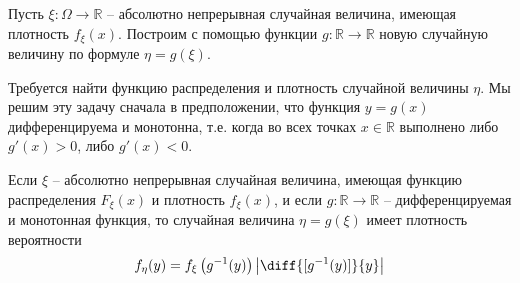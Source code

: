 \begin{zam}
\label{zam:14.1}
Пусть $\xi : \Omega \to \mathbb{R}$ -- абсолютно непрерывная случайная величина, имеющая плотность $f_\xi (x)$. Построим с помощью функции $g : \mathbb{R} \to \mathbb{R}$ новую случайную величину по формуле $\eta = g(\xi)$. 

Требуется найти функцию распределения и плотность случайной величины $\eta$. Мы решим эту задачу сначала в предположении, что функция $y = g(x)$ дифференцируема и монотонна, т.е. когда во всех точках $x \in \mathbb{R}$ выполнено либо $g′(x) > 0$, либо $g′(x) < 0$.	
\end{zam}
\begin{theorem}
	\label{th:14.2}
Если $\xi$ -- абсолютно непрерывная случайная величина, имеющая функцию распределения $F_\xi (x)$ и плотность $f_\xi (x)$, и если $g :\mathbb{R} \to \mathbb{R}$ -- дифференцируемая и монотонная функция, то случайная величина $\eta = g(\xi)$ имеет плотность вероятности
\begin{equation*}
	f_\eta(y)=f_\xi\left(g^{-1}(y)\right)\left|\diff{[g^{-1}(y)]}{y}\right|
\end{equation*}
\end{theorem}
